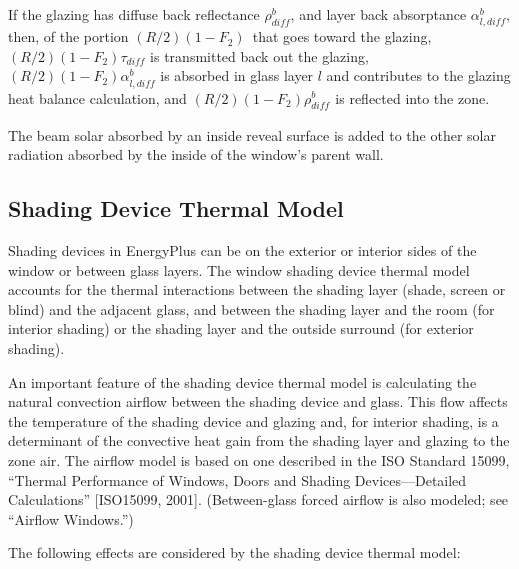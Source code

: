 If the glazing has diffuse back reflectance \(\rho_{diff}^b\), and layer back absorptance \(\alpha_{l,diff}^b\), then, of the portion \((R/2)(1 - {F_2})\)~that goes toward the glazing, \((R/2)(1 - {F_2}){\tau_{diff}}\) is transmitted back out the glazing, \((R/2)(1 - {F_2})\alpha_{l,diff}^b\) is absorbed in glass layer \(l\) and contributes to the glazing heat balance calculation, and \((R/2)(1 - {F_2})\rho_{dif{f_{}}}^b\) is reflected into the zone.

The beam solar absorbed by an inside reveal surface is added to the other solar radiation absorbed by the inside of the window's parent wall.

\subsection{Shading Device Thermal Model}\label{shading-device-thermal-model}

Shading devices in EnergyPlus can be on the exterior or interior sides of the window or between glass layers. The window shading device thermal model accounts for the thermal interactions between the shading layer (shade, screen or blind) and the adjacent glass, and between the shading layer and the room (for interior shading) or the shading layer and the outside surround (for exterior shading).

An important feature of the shading device thermal model is calculating the natural convection airflow between the shading device and glass. This flow affects the temperature of the shading device and glazing and, for interior shading, is a determinant of the convective heat gain from the shading layer and glazing to the zone air. The airflow model is based on one described in the ISO Standard 15099, ``Thermal Performance of Windows, Doors and Shading Devices---Detailed Calculations'' {[}ISO15099, 2001{]}. (Between-glass forced airflow is also modeled; see ``Airflow Windows.'')

The following effects are considered by the shading device thermal model:

